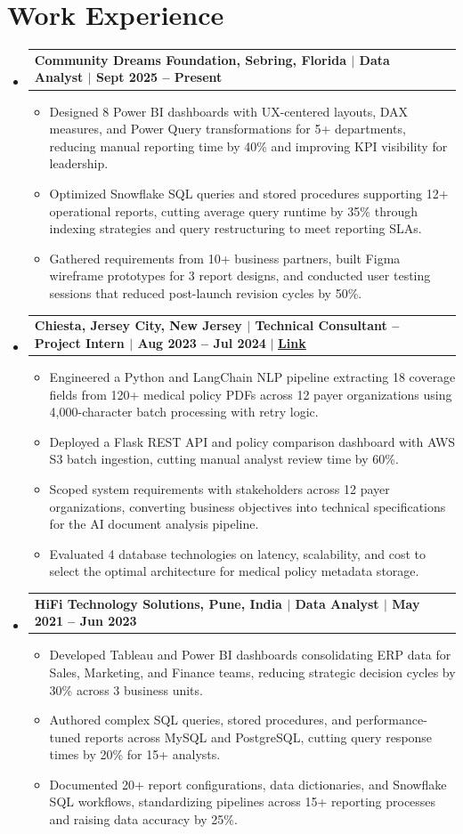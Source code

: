 \documentclass[Sans-serif,10.5 pt]{article}
\makeatletter
\newcommand{\resumeItem}[1]{
  \item\justifying\small{
    {#1 \vspace{-2pt}}
  }
}
\newcommand{\resumeProjectHeading}[2]{
    \item
    \begin{tabular*}{0.97\textwidth}{l@{\extracolsep{\fill}}r}
      \small#1 & #2 \\
    \end{tabular*}\vspace{-8pt}
}
\newcommand{\resumeSubHeadingListStart}{\begin{itemize}[leftmargin=0in, label={}]}
\newcommand{\resumeSubHeadingListEnd}{\end{itemize}}
\newcommand{\resumeItemListStart}{\begin{itemize}}
\newcommand{\resumeItemListEnd}{\end{itemize}\vspace{-5pt}}
\makeatother
\begin{document}
\section{Work Experience}
  \resumeSubHeadingListStart\vspace{-0.5mm}
  \resumeProjectHeading
  {\textbf{Community Dreams Foundation, Sebring, Florida $|$ Data Analyst $|$ Sept 2025 -- Present}}{}
  \resumeItemListStart
    \resumeItem{Designed 8 Power BI dashboards with UX-centered layouts, DAX measures, and Power Query transformations for 5+ departments, reducing manual reporting time by 40\% and improving KPI visibility for leadership.}
    \resumeItem{Optimized Snowflake SQL queries and stored procedures supporting 12+ operational reports, cutting average query runtime by 35\% through indexing strategies and query restructuring to meet reporting SLAs.}
    \resumeItem{Gathered requirements from 10+ business partners, built Figma wireframe prototypes for 3 report designs, and conducted user testing sessions that reduced post-launch revision cycles by 50\%.}
  \resumeItemListEnd\vspace{-1.2mm}
\resumeProjectHeading
{\textbf{Chiesta, Jersey City, New Jersey $|$ Technical Consultant -- Project Intern $|$ Aug 2023 -- Jul 2024} $|$ \href{https://github.com/atharvadevne123/GenAI-Medical-Policy-Analysis}{\textbf{\underline{Link}}}}{}
\resumeItemListStart
\resumeItem{Engineered a Python and LangChain NLP pipeline extracting 18 coverage fields from 120+ medical policy PDFs across 12 payer organizations using 4,000-character batch processing with retry logic.}
\resumeItem{Deployed a Flask REST API and policy comparison dashboard with AWS S3 batch ingestion, cutting manual analyst review time by 60\%.}\vspace{-4mm}
\resumeItem{Scoped system requirements with stakeholders across 12 payer organizations, converting business objectives into technical specifications for the AI document analysis pipeline.}
\resumeItem{Evaluated 4 database technologies on latency, scalability, and cost to select the optimal architecture for medical policy metadata storage.}
\resumeItemListEnd\vspace{-1.2mm}
  \resumeProjectHeading
  {\textbf{HiFi Technology Solutions, Pune, India $|$ Data Analyst $|$ May 2021 -- Jun 2023}}{}
  \resumeItemListStart
    \resumeItem{Developed Tableau and Power BI dashboards consolidating ERP data for Sales, Marketing, and Finance teams, reducing strategic decision cycles by 30\% across 3 business units.}
    \resumeItem{Authored complex SQL queries, stored procedures, and performance-tuned reports across MySQL and PostgreSQL, cutting query response times by 20\% for 15+ analysts.}
    \resumeItem{Documented 20+ report configurations, data dictionaries, and Snowflake SQL workflows, standardizing pipelines across 15+ reporting processes and raising data accuracy by 25\%.}
  \resumeItemListEnd
  \resumeSubHeadingListEnd
\end{document}
